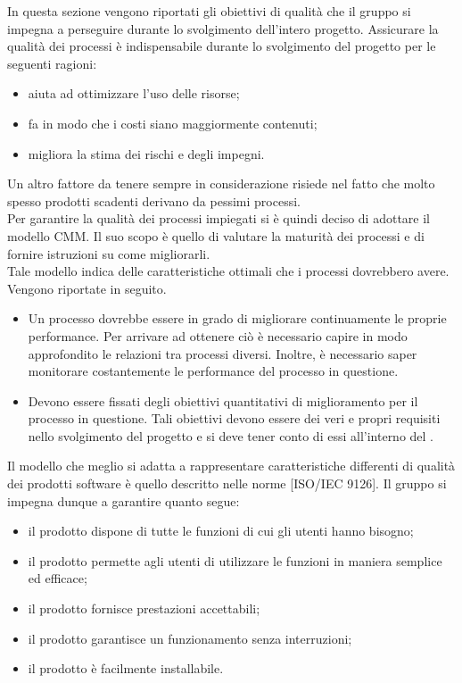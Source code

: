 
	In questa sezione vengono riportati gli obiettivi di qualità che il gruppo \groupname{} si impegna a perseguire durante lo svolgimento dell'intero 
	progetto.
	  \label{subsec:obiettiviprocesso}
		Assicurare la qualità dei processi è indispensabile durante lo svolgimento del progetto per le seguenti ragioni:
		\begin{itemize}
			\item aiuta ad ottimizzare l'uso delle risorse;
			\item fa in modo che i costi siano maggiormente contenuti;
			\item migliora la stima dei rischi e degli impegni.
		\end{itemize}
		Un altro fattore da tenere sempre in considerazione risiede nel fatto che molto spesso prodotti scadenti derivano da pessimi processi.\\
		Per garantire la qualità dei processi impiegati si è quindi deciso di adottare il modello CMM. Il suo scopo è quello di valutare la maturità dei processi e di fornire istruzioni su come migliorarli.\\
		Tale modello indica delle caratteristiche ottimali che i processi dovrebbero avere. Vengono riportate in seguito.
		\begin{itemize}
			\item Un processo dovrebbe essere in grado di migliorare continuamente le proprie performance. Per arrivare ad ottenere ciò è necessario capire in modo approfondito le relazioni tra processi diversi. Inoltre, è necessario saper monitorare costantemente le performance del processo in questione.
			\item Devono essere fissati degli obiettivi quantitativi di miglioramento per il processo in questione. Tali obiettivi devono essere dei veri e propri requisiti nello svolgimento del progetto e si deve tener conto di essi all'interno del .
		\end{itemize}
	  \label{subsec:obiettiviprodotto}
		Il modello che meglio si adatta a rappresentare caratteristiche differenti di qualità dei prodotti software è quello descritto nelle norme [ISO/IEC 9126]. Il gruppo \groupname{} si impegna dunque a garantire quanto segue:
		\begin{itemize}
			\item il prodotto dispone di tutte le funzioni di cui gli utenti hanno bisogno;
			\item il prodotto permette agli utenti di utilizzare le funzioni in maniera semplice ed efficace;
			\item il prodotto fornisce prestazioni accettabili;
			\item il prodotto garantisce un funzionamento senza interruzioni;
			\item il prodotto è facilmente installabile.
		\end{itemize}
